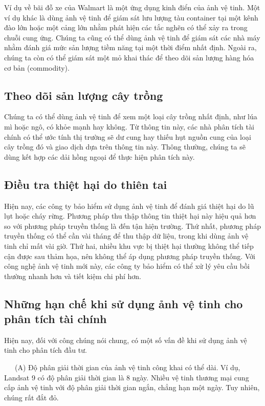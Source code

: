 Ví dụ về bãi đỗ xe của Walmart là một ứng dụng kinh điển của ảnh vệ tinh. Một ví dụ khác là dùng ảnh vệ tinh để giám sát lưu lượng tàu container tại một kênh đào lớn hoặc một cảng lớn nhằm phát hiện các tắc nghẽn có thể xảy ra trong chuỗi cung ứng. Chúng ta cũng có thể dùng ảnh vệ tinh để giám sát các nhà máy nhằm đánh giá mức sản lượng tiềm năng tại một thời điểm nhất định. Ngoài ra, chúng ta còn có thể giám sát một mỏ khai thác để theo dõi sản lượng hàng hóa cơ bản (commodity).

\subsection{Theo dõi sản lượng cây trồng}

Chúng ta có thể dùng ảnh vệ tinh để xem một loại cây trồng nhất định, như lúa mì hoặc ngô, có khỏe mạnh hay không. Từ thông tin này, các nhà phân tích tài chính có thể ước tính thị trường sẽ dư cung hay thiếu hụt nguồn cung của loại cây trồng đó và giao dịch dựa trên thông tin này. Thông thường, chúng ta sẽ dùng kết hợp các dải hồng ngoại để thực hiện phân tích này.

\subsection{Điều tra thiệt hại do thiên tai}

Hiện nay, các công ty bảo hiểm sử dụng ảnh vệ tinh để đánh giá thiệt hại do lũ lụt hoặc cháy rừng. Phương pháp thu thập thông tin thiệt hại này hiệu quả hơn so với phương pháp truyền thống là đến tận hiện trường. Thứ nhất, phương pháp truyền thống có thể cần vài tháng để thu thập dữ liệu, trong khi dùng ảnh vệ tinh chỉ mất vài giờ. Thứ hai, nhiều khu vực bị thiệt hại thường không thể tiếp cận được sau thảm họa, nên không thể áp dụng phương pháp truyền thống. Với công nghệ ảnh vệ tinh mới này, các công ty bảo hiểm có thể xử lý yêu cầu bồi thường nhanh hơn và tiết kiệm chi phí hơn.

\subsection{Những hạn chế khi sử dụng ảnh vệ tinh cho phân tích tài chính}

Hiện nay, đối với công chúng nói chung, có một số vấn đề khi sử dụng ảnh vệ tinh cho phân tích đầu tư.

~~~(A) Độ phân giải thời gian của ảnh vệ tinh công khai có thể dài. Ví dụ, Landsat 9 có độ phân giải thời gian là 8 ngày. Nhiều vệ tinh thương mại cung cấp ảnh vệ tinh với độ phân giải thời gian ngắn, chẳng hạn một ngày. Tuy nhiên, chúng rất đắt đỏ.

